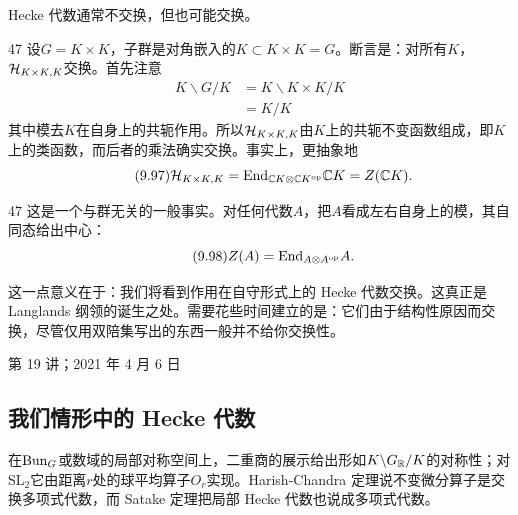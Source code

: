 Hecke 代数通常不交换，但也可能交换。

\begin{srcex}{47}
设$G=K\times K$，子群是对角嵌入的$K\subset K\times K=G$。断言是：对所有$K$，$\mathcal{H}_{K\times K,K}$交换。首先注意
\begin{align}
K\backslash G/K&=K\backslash K\times K/K\tag{9.95}\\
&=K/K\tag{9.96}
\end{align}
其中模去$K$在自身上的共轭作用。所以$\mathcal{H}_{K\times K,K}$由$K$上的共轭不变函数组成，即$K$上的类函数，而后者的乘法确实交换。事实上，更抽象地
\begin{equation}\tag{9.97}
\mathcal{H}_{K\times K,K}=\mathrm{End}_{\mathbb{C} K\otimes\mathbb{C} K^{\mathrm{op}}}\mathbb{C} K=Z(\mathbb{C} K).
\end{equation}
\end{srcex}

\begin{srcrem}{47}
这是一个与群无关的一般事实。对任何代数$A$，把$A$看成左右自身上的模，其自同态给出中心：
\begin{equation}\tag{9.98}
Z(A)=\mathrm{End}_{A\otimes A^{\mathrm{op}}}A.
\end{equation}
\end{srcrem}

这一点意义在于：我们将看到作用在自守形式上的 Hecke 代数交换。这真正是 Langlands 纲领的诞生之处。需要花些时间建立的是：它们由于结构性原因而交换，尽管仅用双陪集写出的东西一般并不给你交换性。

\begin{flushright}\small 第 19 讲；2021 年 4 月 6 日\end{flushright}

\subsection{我们情形中的 Hecke 代数}
\begin{sectionkey}
在$\mathrm{Bun}_G$或数域的局部对称空间上，二重商的展示给出形如$K\backslash G_{\mathbb{R}}/K$的对称性；对$\mathrm{SL}_2$它由距离$r$处的球平均算子$O_r$实现。Harish-Chandra 定理说不变微分算子是交换多项式代数，而 Satake 定理把局部 Hecke 代数也说成多项式代数。
\end{sectionkey}

